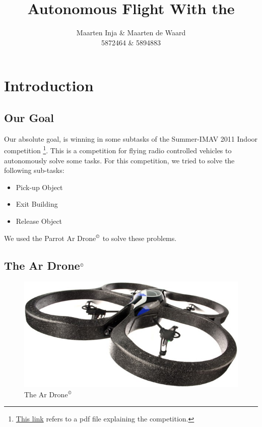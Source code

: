 \documentclass[a4paper,10pt]{article}
\title{Autonomous Flight With the \Ardrone}
\author{Maarten Inja \& Maarten de Waard\\\small 5872464 \& 5894883}
\newcommand{\Ardrone}{Ar Drone$^{\copyright}$ }
\begin{document}
\maketitle

\section{Introduction}

\subsection{Our Goal}
Our absolute goal, is winning in some subtasks of the Summer-IMAV 2011 Indoor competition \footnote{\href{http://www.imav2011.org/images/stories/documents/summerimav2011\%20indoor\%20challenges\%20v2.0.pdf}{This link} refers to a pdf file explaining the competition.}.
This is a competition for flying radio controlled vehicles to autonomously solve some tasks. For this competition, we tried to solve the following sub-tasks:
\begin{itemize}
    \item Pick-up Object
    \item Exit Building
    \item Release Object
\end{itemize}
We used the Parrot \Ardrone to solve these problems.

\subsection{The \Ardrone}
\begin{figure}
  \centering
      \includegraphics[scale=0.5]{arDrone.jpg}
  \caption{The \Ardrone}
\end{figure}
\end{document}
